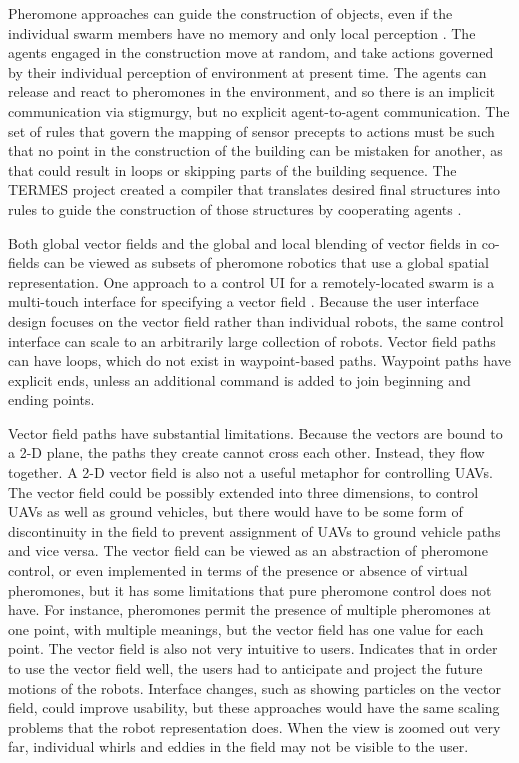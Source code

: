 \documentclass[]{article}
\begin{document}
Pheromone approaches can guide the construction of objects, even if the individual swarm members have no memory and only local perception \cite{mason2003programming}. 
The agents engaged in the construction move at random, and take actions governed by their individual perception of environment at present time. 
The agents can release and react to pheromones in the environment, and so there is an implicit communication via stigmurgy, but no explicit agent-to-agent communication. 
The set of rules that govern the mapping of sensor precepts to actions must be such that no point in the construction of the building can be mistaken for another, as that could result in loops or skipping parts of the building sequence. 
The TERMES project created a compiler that translates desired final structures into rules to guide the construction of those structures by cooperating agents \cite{werfel2014designing}.

Both global vector fields and the global and local blending of vector fields in co-fields can be viewed as subsets of pheromone robotics that use a global spatial representation. 
One approach to a control UI for a remotely-located swarm is a multi-touch interface for specifying a vector field \cite{Kato:2009:MIC:1520340.1520500}.
Because the user interface design focuses on the vector field rather than individual robots, the same control interface can scale to an arbitrarily large collection of robots. 
Vector field paths can have loops, which do not exist in waypoint-based paths. 
Waypoint paths have explicit ends, unless an additional command is added to join beginning and ending points. 

Vector field paths have substantial limitations. 
Because the vectors are bound to a 2-D plane, the paths they create cannot cross each other. 
Instead, they flow together. 
A 2-D vector field is also not a useful metaphor for controlling UAVs.
The vector field could be possibly extended into three dimensions, to control UAVs as well as ground vehicles, but there would have to be some form of discontinuity in the field to prevent assignment of UAVs to ground vehicle paths and vice versa. 
The vector field can be viewed as an abstraction of pheromone control, or even implemented in terms of the presence or absence of virtual pheromones, but it has some limitations that pure pheromone control does not have.
For instance, pheromones permit the presence of multiple pheromones at one point, with multiple meanings, but the vector field has one value for each point. 
The vector field is also not very intuitive to users. 
Indicates that in order to use the vector field well, the users had to anticipate and project the future motions of the robots. 
Interface changes, such as showing particles on the vector field, could improve usability, but these approaches would have the same scaling problems that the robot representation does. 
When the view is zoomed out very far, individual whirls and eddies in the field may not be visible to the user. 
\end{document}
